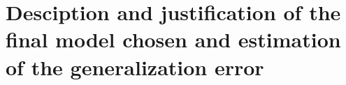 
\section{Desciption and justification of the final model chosen and estimation of the generalization error}

